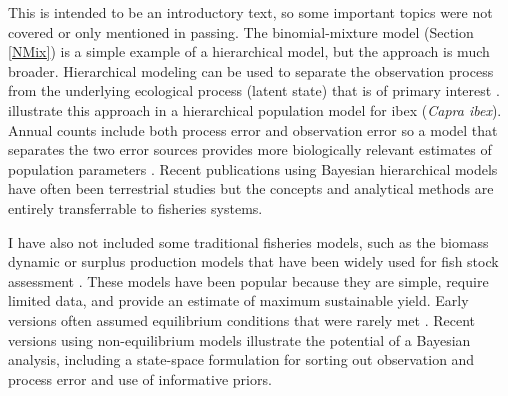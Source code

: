 \documentclass[
]{krantz}
\begin{document}
This is intended to be an introductory text, so some important topics were not covered or only mentioned in passing. The binomial-mixture model (Section \ref{NMix}) is a simple example of a hierarchical model, but the approach is much broader. Hierarchical modeling can be used to separate the observation process from the underlying ecological process (latent state) that is of primary interest \citep{royle.dorazio_2008}. \citet{kéry.schaub_2012} illustrate this approach in a hierarchical population model for ibex (\emph{Capra ibex}). Annual counts include both process error and observation error so a model that separates the two error sources provides more biologically relevant estimates of population parameters \citep{kéry.schaub_2012}. Recent publications using Bayesian hierarchical models have often been terrestrial studies \citep[e.g.,][]{johnson.etal_2010} but the concepts and analytical methods are entirely transferrable to fisheries systems.

I have also not included some traditional fisheries models, such as the biomass dynamic or surplus production models that have been widely used for fish stock assessment \citep{hilborn.walters_1992}. These models have been popular because they are simple, require limited data, and provide an estimate of maximum sustainable yield. Early versions often assumed equilibrium conditions that were rarely met \citep{hilborn.walters_1992}. Recent versions using non-equilibrium models \citep{meyer.millar_1999, winker.etal_2018} illustrate the potential of a Bayesian analysis, including a state-space formulation for sorting out observation and process error and use of informative priors.
\end{document}
